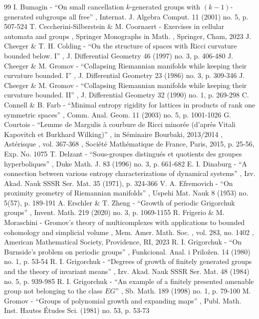 \documentclass[11pt]{article}
\theoremstyle{definition}
\numberwithin{equation}{section}
\begin{document}
\begin{thebibliography}{99}
 I. Bumagin - “On small cancellation $k$-generated groups with $(k-1)$-generated subgroups all free” , Internat. J. Algebra Comput. 11 (2001) no. 5, p. 507-524
 T. Ceccherini-Silberstein \& M. Coornaert - Exercises in cellular automata and groups , Springer Monographs in Math. , Springer, Cham, 2023
 J. Cheeger \& T. H. Colding - “On the structure of spaces with Ricci curvature bounded below. I” , J. Differential Geometry 46 (1997) no. 3, p. 406-480
 J. Cheeger \& M. Gromov - “Collapsing Riemannian manifolds while keeping their curvature bounded. I” , J. Differential Geometry 23 (1986) no. 3, p. 309-346
 J. Cheeger \& M. Gromov - “Collapsing Riemannian manifolds while keeping their curvature bounded. II” , J. Differential Geometry 32 (1990) no. 1, p. 269-298
 C. Connell \& B. Farb - “Minimal entropy rigidity for lattices in products of rank one symmetric spaces” , Comm. Anal. Geom. 11 (2003) no. 5, p. 1001-1026
 G. Courtois - “Lemme de Margulis à courbure de Ricci minorée (d’après Vitali Kapovitch et Burkhard Wilking)” , in Séminaire Bourbaki, 2013/2014 , Astérisque , vol. 367-368 , Société Mathématique de France, Paris, 2015, p. 25-56, Exp. No. 1075
 T. Delzant - “Sous-groupes distingués et quotients des groupes hyperboliques” , Duke Math. J. 83 (1996) no. 3, p. 661-682
 E. I. Dinaburg - “A connection between various entropy characterizations of dynamical systems” , Izv. Akad. Nauk SSSR Ser. Mat. 35 (1971), p. 324-366
 V. A. Efremovich - “On proximity geometry of Riemannian manifolds” , Uspehi Mat. Nauk 8 (1953) no. 5(57), p. 189-191
 A. Erschler \& T. Zheng - “Growth of periodic Grigorchuk groups” , Invent. Math. 219 (2020) no. 3, p. 1069-1155
 R. Frigerio \& M. Moraschini - Gromov’s theory of multicomplexes with applications to bounded cohomology and simplicial volume , Mem. Amer. Math. Soc. , vol. 283, no. 1402 , American Mathematical Society, Providence, RI, 2023
 R. I. Grigorchuk - “On Burnside’s problem on periodic groups” , Funkcional. Anal. i Priložen. 14 (1980) no. 1, p. 53-54
 R. I. Grigorchuk - “Degrees of growth of finitely generated groups and the theory of invariant means” , Izv. Akad. Nauk SSSR Ser. Mat. 48 (1984) no. 5, p. 939-985
 R. I. Grigorchuk - “An example of a finitely presented amenable group not belonging to the class $EG$” , Sb. Math. 189 (1998) no. 1, p. 79-100
 M. Gromov - “Groups of polynomial growth and expanding maps” , Publ. Math. Inst. Hautes Études Sci. (1981) no. 53, p. 53-73

\end{thebibliography}
\end{document}
